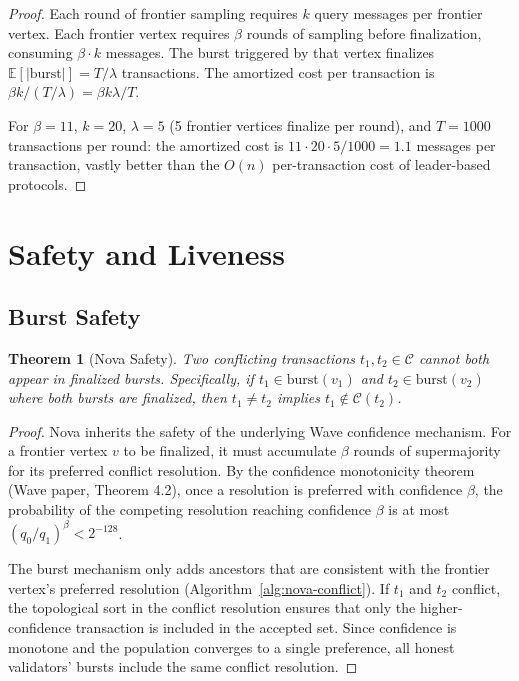 \documentclass[11pt,a4paper]{article}
\newtheorem{theorem}{Theorem}[section]
\begin{document}
\begin{proof}
Each round of frontier sampling requires $k$ query messages per frontier vertex.
Each frontier vertex requires $\beta$ rounds of sampling before finalization,
consuming $\beta \cdot k$ messages. The burst triggered by that vertex finalizes
$\mathbb{E}[|\text{burst}|] = T/\lambda$ transactions. The amortized cost per
transaction is $\beta k / (T/\lambda) = \beta k \lambda / T$.

For $\beta = 11$, $k = 20$, $\lambda = 5$ (5 frontier vertices finalize per round),
and $T = 1000$ transactions per round: the amortized cost is
$11 \cdot 20 \cdot 5 / 1000 = 1.1$ messages per transaction, vastly better than
the $O(n)$ per-transaction cost of leader-based protocols.
\end{proof}

\section{Safety and Liveness}
\label{sec:safety}

\subsection{Burst Safety}

\begin{theorem}[Nova Safety]
\label{thm:nova-safety}
Two conflicting transactions $t_1, t_2 \in \mathcal{C}$ cannot both appear in
finalized bursts. Specifically, if $t_1 \in \text{burst}(v_1)$ and
$t_2 \in \text{burst}(v_2)$ where both bursts are finalized, then $t_1 \neq t_2$
implies $t_1 \notin \mathcal{C}(t_2)$.
\end{theorem}

\begin{proof}
Nova inherits the safety of the underlying Wave confidence mechanism. For a frontier
vertex $v$ to be finalized, it must accumulate $\beta$ rounds of supermajority for
its preferred conflict resolution. By the confidence monotonicity theorem (Wave paper,
Theorem 4.2), once a resolution is preferred with confidence $\beta$, the probability
of the competing resolution reaching confidence $\beta$ is at most $(q_0/q_1)^\beta < 2^{-128}$.

The burst mechanism only adds ancestors that are consistent with the frontier vertex's
preferred resolution (Algorithm~\ref{alg:nova-conflict}). If $t_1$ and $t_2$ conflict,
the topological sort in the conflict resolution ensures that only the higher-confidence
transaction is included in the accepted set. Since confidence is monotone and the
population converges to a single preference, all honest validators' bursts include
the same conflict resolution.
\end{proof}
\end{document}
